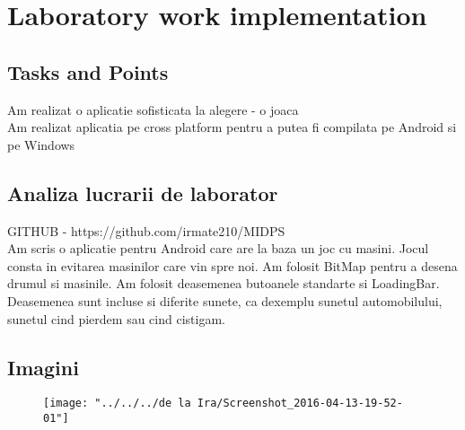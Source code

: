 \section{Laboratory work implementation}

\subsection{Tasks and Points}

Am realizat o aplicatie sofisticata la alegere - o joaca\\

Am realizat aplicatia pe cross platform pentru a putea fi compilata pe Android si pe Windows

\subsection{Analiza lucrarii de laborator}

GITHUB - https://github.com/irmate210/MIDPS\\

Am scris o aplicatie pentru Android care are la baza un joc cu masini. Jocul consta in evitarea masinilor care vin spre noi. Am folosit BitMap pentru a desena drumul si masinile. Am folosit deasemenea butoanele standarte si LoadingBar. Deasemenea sunt incluse si diferite sunete, ca dexemplu sunetul automobilului, sunetul cind pierdem sau cind cistigam.

\subsection{Imagini}

\begin{figure}
	
\texttt{[image: "../../../de la Ira/Screenshot\_2016-04-13-19-52-01"]}
\caption{}
\label{fig:Screenshot_2016-04-13-19-52-01}
\end{figure}


\clearpage